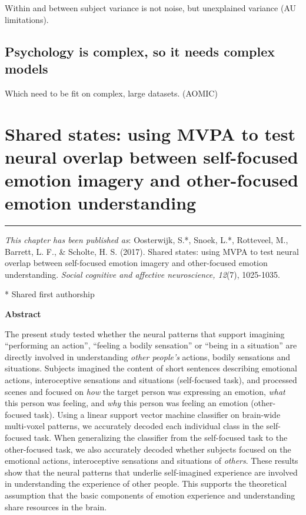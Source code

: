 \documentclass[12pt,american,a4paper,oneside,]{memoir} %
\begin{document}
Within and between subject variance is not noise, but unexplained variance (AU limitations).

\hypertarget{psychology-is-complex-so-it-needs-complex-models}{%
\section{Psychology is complex, so it needs complex models}\label{psychology-is-complex-so-it-needs-complex-models}}

Which need to be fit on complex, large datasets. (AOMIC)

\hypertarget{shared-states}{%
\chapter{Shared states: using MVPA to test neural overlap between self-focused emotion imagery and other-focused emotion understanding}\label{shared-states}}


\vspace*{\fill}

\begin{center}\rule{0.5\linewidth}{0.5pt}\end{center}

\small

\noindent
\emph{This chapter has been published as}: Oosterwijk, S.*, Snoek, L.*, Rotteveel, M., Barrett, L. F., \& Scholte, H. S. (2017). Shared states: using MVPA to test neural overlap between self-focused emotion imagery and other-focused emotion understanding. \emph{Social cognitive and affective neuroscience, 12}(7), 1025-1035.

* Shared first authorship
\newpage
\normalsize

\textbf{Abstract}

The present study tested whether the neural patterns that support imagining ``performing an action'', ``feeling a bodily sensation'' or ``being in a situation'' are directly involved in understanding \emph{other people's} actions, bodily sensations and situations. Subjects imagined the content of short sentences describing emotional actions, interoceptive sensations and situations (self-focused task), and processed scenes and focused on \emph{how} the target person was expressing an emotion, \emph{what} this person was feeling, and \emph{why} this person was feeling an emotion (other-focused task). Using a linear support vector machine classifier on brain-wide multi-voxel patterns, we accurately decoded each individual class in the self-focused task. When generalizing the classifier from the self-focused task to the other-focused task, we also accurately decoded whether subjects focused on the emotional actions, interoceptive sensations and situations of \emph{others}. These results show that the neural patterns that underlie self-imagined experience are involved in understanding the experience of other people. This supports the theoretical assumption that the basic components of emotion experience and understanding share resources in the brain.
\end{document}
